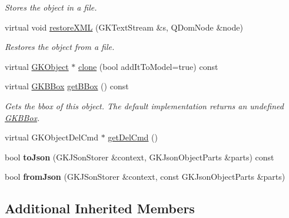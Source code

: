 \begin{DoxyCompactItemize}
\begin{DoxyCompactList}\small\item\em Stores the object in a file. \end{DoxyCompactList}\item 
virtual void \hyperlink{classGKDPoint_a6744505094d40f1d02c591e3f5578c15}{restore\+X\+ML} (G\+K\+Text\+Stream \&s, Q\+Dom\+Node \&node)\hypertarget{classGKDPoint_a6744505094d40f1d02c591e3f5578c15}{}\label{classGKDPoint_a6744505094d40f1d02c591e3f5578c15}

\begin{DoxyCompactList}\small\item\em Restores the object from a file. \end{DoxyCompactList}\item 
virtual \hyperlink{classGKObject}{G\+K\+Object} $\ast$ \hyperlink{classGKDPoint_a8289d0a5357e581c7a0450f8fa649ecd}{clone} (bool add\+It\+To\+Model=true) const 
\item 
virtual \hyperlink{classGKBBox}{G\+K\+B\+Box} \hyperlink{classGKDPoint_a80b5a875f922428266ba7922b78c6f99}{get\+B\+Box} () const \hypertarget{classGKDPoint_a80b5a875f922428266ba7922b78c6f99}{}\label{classGKDPoint_a80b5a875f922428266ba7922b78c6f99}

\begin{DoxyCompactList}\small\item\em Gets the bbox of this object. The default implementation returns an undefined \hyperlink{classGKBBox}{G\+K\+B\+Box}. \end{DoxyCompactList}\item 
virtual G\+K\+Object\+Del\+Cmd $\ast$ \hyperlink{classGKDPoint_a7d0d52055586cf5807d1db051c0eea1f}{get\+Del\+Cmd} ()
\item 
bool {\bfseries to\+Json} (G\+K\+J\+Son\+Storer \&context, G\+K\+Json\+Object\+Parts \&parts) const \hypertarget{classGKDPoint_ad8b232eaf70581016b53ba501d9870e3}{}\label{classGKDPoint_ad8b232eaf70581016b53ba501d9870e3}

\item 
bool {\bfseries from\+Json} (G\+K\+J\+Son\+Storer \&context, const G\+K\+Json\+Object\+Parts \&parts)\hypertarget{classGKDPoint_ad731f6f44093b6f3a9920468748a5ae9}{}\label{classGKDPoint_ad731f6f44093b6f3a9920468748a5ae9}

\end{DoxyCompactItemize}
\subsection*{Additional Inherited Members}


